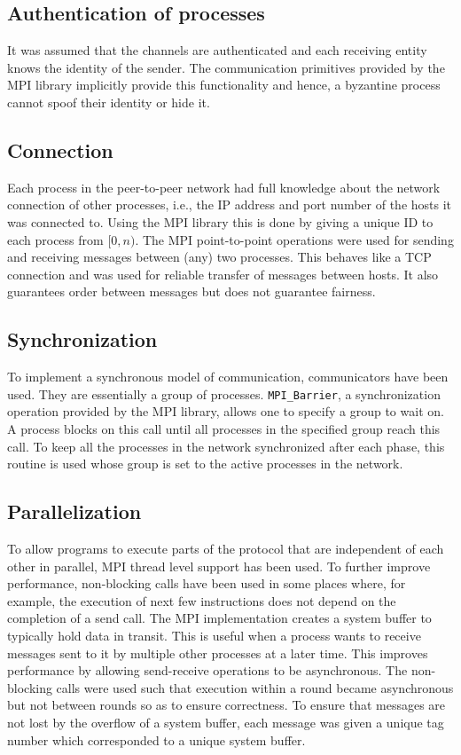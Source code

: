 \subsection{Authentication of processes}
It was assumed that the channels are authenticated and each receiving entity knows the identity of the sender. The communication primitives provided by the MPI library implicitly provide this functionality and hence, a byzantine process cannot spoof their identity or hide it.

\subsection{Connection}
Each process in the peer-to-peer network had full knowledge about the network connection of other processes, i.e., the IP address and port number of the hosts it was connected to. Using the MPI library this is done by giving a unique ID to each process from $[0, n)$. The MPI point-to-point operations were used for sending and receiving messages between (any) two processes. This behaves like a TCP connection and was used for reliable transfer of messages between hosts. It also guarantees order between messages but does not guarantee fairness.%

\subsection{Synchronization}
To implement a synchronous model of communication, communicators have been used. They are essentially a group of processes. \texttt{MPI\_Barrier}, a synchronization operation provided by the MPI library, allows one to specify a group to wait on. A process blocks on this call until all processes in the specified group reach this call. To keep all the processes in the network synchronized after each phase, this routine is used whose group is set to the active processes in the network.

\subsection{Parallelization}
To allow programs to execute parts of the protocol that are independent of each other in parallel, MPI thread level support has been used. To further improve performance, non-blocking calls have been used in some places where, for example, the execution of next few instructions does not depend on the completion of a send call. The MPI implementation creates a system buffer to typically hold data in transit. This is useful when a process wants to receive messages sent to it by multiple other processes at a later time. This improves performance by allowing send-receive operations to be asynchronous. The non-blocking calls were used such that execution within a round became asynchronous but not between rounds so as to ensure correctness. To ensure that messages are not lost by the overflow of a system buffer, each message was given a unique tag number which corresponded to a unique system buffer.


